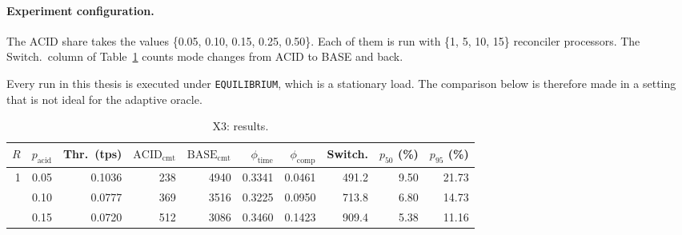 \paragraph{Experiment configuration.} The ACID share takes the values \{0.05,
0.10, 0.15, 0.25, 0.50\}. Each of them is run with \{1, 5, 10, 15\}
reconciler processors. The Switch.\ column
of Table~\ref{tab:x3-summary} counts mode changes from ACID to BASE and back.

Every run in this thesis is executed under \texttt{EQUILIBRIUM}, which is a stationary
load. The comparison below is therefore made in a setting that is not ideal for
the adaptive oracle.

\begin{table}[htbp]
  \centering
  \captionsetup{format=plain,justification=centering}
  \caption{X3: results.}
  \label{tab:x3-summary}
  \small
  \setlength{\tabcolsep}{4pt}
  \begin{tabular}{r r r r r r r r r r}
    \toprule
    $R$                    & $p_{\mathrm{acid}}$            & Thr.\ (tps)
                           & $\mathrm{ACID}_{\mathrm{cmt}}$ & $\mathrm{BASE}_{\mathrm{cmt}}$ &
    $\phi_{\mathrm{time}}$ & $\phi_{\mathrm{comp}}$         & Switch.
                           & $p_{50}$ (\%)                  & $p_{95}$ (\%)
    \\
    \midrule
    1                      & 0.05                           & 0.1036                         & 238
                           & 4940                           & 0.3341                         & 0.0461
                           & 491.2                          & 9.50
                           & 21.73                                                                    \\
                           & 0.10                           & 0.0777                         & 369
                           & 3516                           & 0.3225                         & 0.0950
                           & 713.8                          & 6.80
                           & 14.73                                                                    \\
                           & 0.15                           & 0.0720                         & 512
                           & 3086                           & 0.3460                         & 0.1423
                           & 909.4                          & 5.38
                           & 11.16                                                                    \\

\end{tabular}
\end{table}

